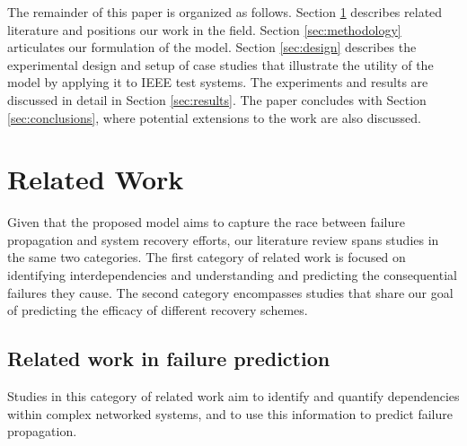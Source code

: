 \documentclass[conference]{IEEEtran}
\begin{document}
The remainder of this paper is organized as follows. Section \ref{sec:relatedwork} describes related literature and positions our work in the field. Section \ref{sec:methodology} articulates our formulation of the model. Section \ref{sec:design} describes the experimental design and setup of case studies that illustrate the utility of the model by applying it to IEEE test systems. The experiments and results are discussed in detail in Section \ref{sec:results}. The paper concludes with Section \ref{sec:conclusions}, where potential extensions to the work are also discussed. 

\section{Related Work}\label{sec:relatedwork}
Given that the proposed model aims to capture the race between failure propagation and system recovery efforts, our literature review spans studies in the same two categories. The first category of related work is focused on identifying interdependencies and understanding and predicting the consequential failures they cause. 
The second category encompasses studies that share our goal of predicting the efficacy of different recovery schemes. 


\subsection{Related work in failure prediction}

Studies in this category of related work aim to identify and quantify dependencies within complex networked systems, and to use this information to predict failure propagation. 
\end{document}
